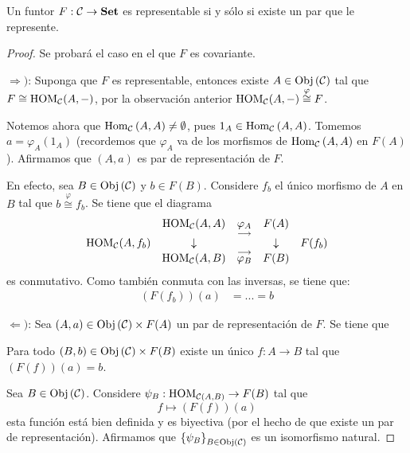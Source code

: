 \documentclass[12pt]{report}
\theoremstyle{largebreak}
\newcommand\cf[3]{\ensuremath{#1:#2\rightarrow#3}}
\newcommand{\Obj}[1]{\ensuremath{\textup{Obj}\left(#1\right)}}
\newcommand{\Hom}[3]{\ensuremath{\textup{Hom}_{#1}\left(#2,#3\right)}}
\newcommand{\Cat}[1]{\ensuremath{\textup{\textbf{#1}}}}
\begin{document}
    \begin{propo}
        Un funtor $\cf{F}{\mathcal{C}}{\Cat{Set}}$ es representable si y sólo si existe un par que le represente.
    \end{propo}

    \begin{proof}
        Se probará el caso en el que $F$ es covariante.

        $\Rightarrow)$: Suponga que $F$ es representable, entonces existe $A\in\Obj{\mathcal{C}}$ tal que $F\cong \textup{HOM}_{\mathcal{C}}(A,-)$, por la observación anterior $\textup{HOM}_{\mathcal{C}}(A,-)\overset{\varphi}{\cong}F$.

        Notemos ahora que $\Hom{\mathcal{C}}{A}{A}\neq\emptyset$, pues $1_A\in\Hom{\mathcal{C}}{A}{A}$. Tomemos $a=\varphi_A(1_A)$ (recordemos que $\varphi_A$ va de los morfismos de $\Hom{\mathcal{C}}{A}{A}$ en $F(A)$). Afirmamos que $(A,a)$ es par de representación de $F$.

        En efecto, sea $B\in\Obj{\mathcal{C}}$ y $b\in F(B)$. Considere $f_b$ el único morfismo de $A$ en $B$ tal que $b\overset{\varphi}{\cong}f_b$. Se tiene que el diagrama
        \begin{equation*}
            \begin{array}{rcccl}
                & \textup{HOM}_{\mathcal{C}}(A,A) & \underset{\longrightarrow}{\varphi_{A}} & F(A) &\\
                \textup{HOM}_{\mathcal{C}}(A,f_b) & \downarrow & & \downarrow & F(f_b) \\
                & \textup{HOM}_{\mathcal{C}}(A,B) & \overset{\longrightarrow}{\varphi_{B}} & F(B) &\\
            \end{array}
        \end{equation*}
        es conmutativo. Como también conmuta con las inversas, se tiene que:
        \begin{equation*}
            \begin{split}
                \left(F(f_b)\right)(a)&=... =b
            \end{split}
        \end{equation*}

        $\Leftarrow)$: Sea $(A,a)\in\Obj{\mathcal{C}}\times F(A)$ un par de representación de $F$. Se tiene que

        Para todo $(B,b)\in\Obj{\mathcal{C}}\times F(B)$ existe un único $\cf{f}{A}{B}$ tal que $(F(f))(a)=b$.

        Sea $B\in\Obj{\mathcal{C}}$. Considere $\cf{\psi_B}{\HOM{\mathcal{C}(A,B)}}{F(B)}$ tal que
        \begin{equation*}
            f\mapsto (F(f))(a)
        \end{equation*}
        esta función está bien definida y es biyectiva (por el hecho de que existe un par de representación). Afirmamos que $\left\{\psi_B\right\}_{B\in\Obj{\mathcal{C}}}$ es un isomorfismo natural.


\end{proof}
\end{document}

